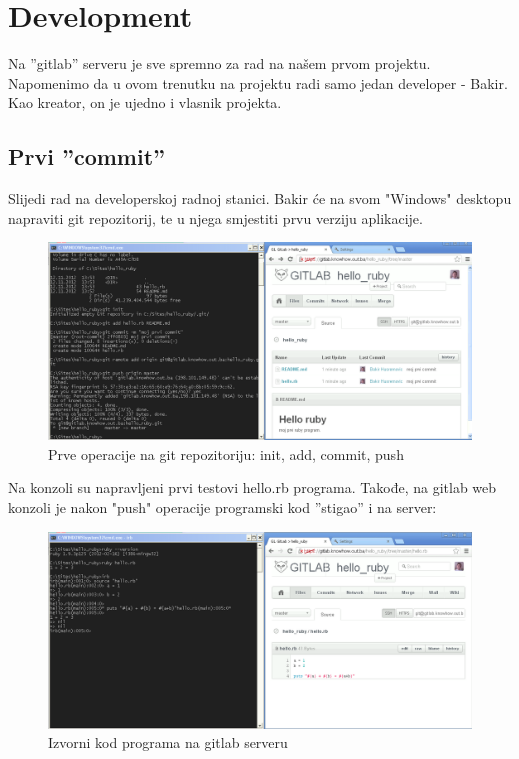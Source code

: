 \documentclass[times, utf8, seminar]{fit}
\begin{document}
\section{Development}

Na ''gitlab'' serveru je sve spremno za rad na našem prvom projektu. Napomenimo da u ovom trenutku na projektu radi samo jedan developer - Bakir. Kao kreator, on je ujedno i vlasnik projekta.

\subsection{Prvi ''commit''}

Slijedi rad na developerskoj radnoj stanici. Bakir će na svom "Windows" desktopu napraviti git repozitorij, te u njega smjestiti prvu verziju aplikacije.

\begin{figure}[H]
\centering
\includegraphics[width=15cm]{img/gitlab_first_commit.png}
\caption{Prve operacije na git repozitoriju: init, add, commit, push}
\end{figure}

Na konzoli su napravljeni prvi testovi hello.rb programa. Takođe, na gitlab web konzoli je nakon "push" operacije programski kod ''stigao'' i na server:

\begin{figure}[H]
\centering
\includegraphics[width=15cm]{img/gitlab_first_commit_2.png}
\caption{Izvorni kod programa na gitlab serveru}
\end{figure}
\end{document}
